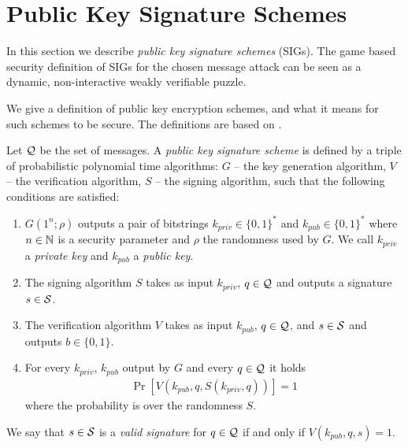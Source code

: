 \section{Public Key Signature Schemes}
\label{section:pks}
In this section we describe \textit{public key signature schemes} (SIGs).
The game based security definition of SIGs for the chosen message attack can be seen as a dynamic,
non-interactive weakly verifiable puzzle.

We give a definition of public key encryption schemes, and what it means for such schemes to be secure.
The definitions are based on \cite{Goldreich:2004:FCV:975541}.

\begin{definition}
Let $\mathcal{Q}$ be the set of messages. A \textit{public key signature scheme} is defined by a triple of probabilistic polynomial time algorithms:
$G$ -- the key generation algorithm,
$V$ -- the verification algorithm,
$S$ -- the signing algorithm,
such that the following conditions are satisfied:
\begin{enumerate}[-]
  \item $G(1^n; \rho)$ outputs a pair of bitstrings $k_{priv} \in \{0,1\}^{*}$ and $k_{pub} \in \{0,1\}^{*}$ where $n \in \mathbb{N}$ is a security
    parameter and $\rho$ the randomness used by $G$. We call $k_{priv}$ a \textit{private key} and $k_{pub}$ a \textit{public key}.
  \item The signing algorithm $S$ takes as input $k_{priv}$, $q \in \mathcal{Q}$ and outputs a signature $s \in \mathcal{S}$.
  \item The verification algorithm $V$ takes as input $k_{pub}$, $q \in \mathcal{Q}$, and $s \in \mathcal{S}$ and outputs $b \in \{0,1\}$.
  \item For every $k_{priv}$, $k_{pub}$ output by $G$ and every $q \in \mathcal{Q}$ it holds
    \begin{align*}
      \Pr[V(k_{pub}, q, S(k_{priv}, q))] = 1
    \end{align*}
    where the probability is over the randomness $S$.
\end{enumerate}
\end{definition}
We say that $s \in \mathcal{S}$ is a \textit{valid signature} for $q \in \mathcal{Q}$ if and only if $V(k_{pub}, q, s) = 1$.

